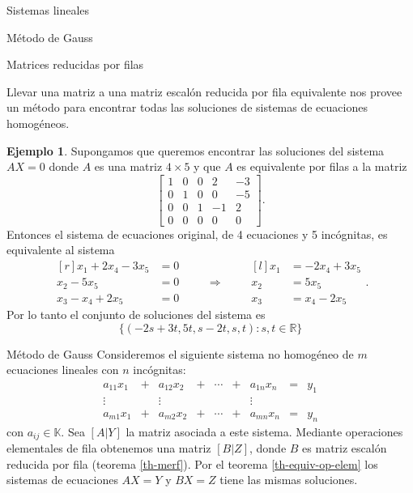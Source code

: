 \documentclass[a4paper,12pt,twoside,spanish,reqno]{amsbook}
\theoremstyle{definition}
\newtheorem{ejemplo}{Ejemplo}[section]
\theoremstyle{remark}
\newcommand{\R}{\mathbb R}
\newcommand{\K}{\mathbb K}
\begin{document}
\begin{chapter}{Sistemas lineales}
\begin{section}{Método de Gauss }
\begin{subsection}{Matrices reducidas por filas}
				
			
				
	
				
				Llevar una matriz a una matriz  escalón reducida por fila equivalente nos provee un método para encontrar todas las soluciones de sistemas de ecuaciones homogéneos.
				
				\begin{ejemplo}
					Supongamos que queremos encontrar las soluciones del sistema $AX = 0$ donde $A$ es una matriz $4 \times 5$ y que $A$ es equivalente por filas a la matriz
					\begin{equation*}
					\begin{bmatrix} 1&0&0&2&-3 \\ 0&1&0&0&-5 \\ 0&0&1&-1&2 \\ 0&0&0&0&0\end{bmatrix}.
					\end{equation*} 
					Entonces el sistema de ecuaciones original, de 4 ecuaciones y 5 incógnitas,  es equivalente al sistema
					\begin{equation*}
					\begin{matrix*}[r]
					x_1 +2x_4 -3x_5 &= 0 \\ x_2 -5x_5 &= 0 \\ x_3-x_4+2x_5 &= 0
					\end{matrix*} 
					\qquad \Rightarrow \qquad 
					\begin{matrix*}[l]
					x_1  &= -2x_4 +3x_5 \\ x_2  &= 5x_5 \\ x_3 &= x_4-2x_5
					\end{matrix*}. 
					\end{equation*}
					Por  lo tanto el conjunto de soluciones del sistema es
					\begin{equation*}
					\{(-2s +3t,  5t,  s-2t, s, t): s,t \in \R\}
					\end{equation*}
				\end{ejemplo}   
			\end{subsection}
			
			
			\begin{subsection}{Método de Gauss} Consideremos el siguiente sistema no homogéneo de $m$ ecuaciones lineales con $n$ incógnitas:
				\begin{equation*}
				\begin{matrix}
				a_{11}x_1& + &a_{12}x_2& + &\cdots& + &a_{1n}x_n &= &y_1\\
				\vdots&  &\vdots& &&  &\vdots \\
				a_{m1}x_1& + &a_{m2}x_2& + &\cdots& + &a_{mn}x_n &=&y_n
				\end{matrix}
				\end{equation*}
				con $a_{ij} \in \K$. Sea $[A | Y]$ la matriz asociada a este sistema. Mediante operaciones elementales de fila obtenemos una matriz $[B|Z]$, donde $B$ es matriz escalón reducida por fila (teorema \ref{th-merf}). Por el teorema \ref{th-equiv-op-elem} los sistemas de ecuaciones $AX=Y$ y $BX=Z$ tiene las mismas soluciones. 
				

\end{subsection}
\end{section}
\end{chapter}
\end{document}
